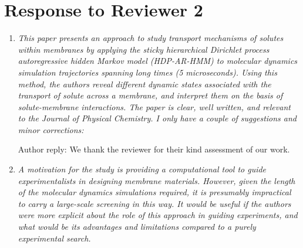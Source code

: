 \documentclass{article}
\begin{document}
\section*{Response to Reviewer 2}

\begin{enumerate}[label={Comment \theenumi :}, leftmargin=3.9\parindent]  

    \item \textit{This paper presents an approach to study transport mechanisms of solutes within
    membranes by applying the sticky hierarchical Dirichlet process autoregressive hidden Markov model
    (HDP-AR-HMM) to molecular dynamics simulation trajectories spanning long times (5 microseconds). 
    Using this method, the authors reveal different dynamic states associated with the transport of 
    solute across a membrane, and interpret them on the basis of solute-membrane interactions. The 
    paper is clear, well written, and relevant to the Journal of Physical Chemistry. I only have a 
    couple of suggestions and minor corrections:}
    
    Author reply: We thank the reviewer for their kind assessment of our work.

    \item \textit{A motivation for the study is providing a computational tool to guide experimentalists
    in designing membrane materials. However, given the length of the molecular dynamics simulations 
    required, it is presumably impractical to carry a large-scale screening in this way. It would be 
    useful if the authors were more explicit about the role of this approach in guiding experiments, 
    and what would be its advantages and limitations compared to a purely experimental search.}
    

\end{enumerate}
\end{document}
